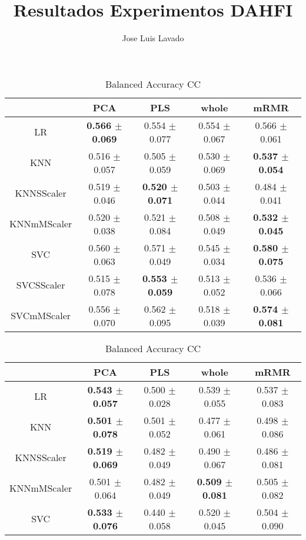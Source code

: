 \documentclass[]{report}
\title{Resultados Experimentos DAHFI}
\author{Jose Luis Lavado}
\begin{document}
\maketitle

	\begin{table}
		\centering
		\setlength{\aboverulesep}{0pt}
		\setlength{\belowrulesep}{0pt}
		\begin{tabular}{c|cccc}
			\hline
			             & PCA             & PLS             & whole           & mRMR            \\
			\hline
			 LR          & \textbf{0.566 $\pm$ 0.069} & 0.554 $\pm$ 0.077 & 0.554 $\pm$ 0.067 & 0.566 $\pm$ 0.061 \\
			 KNN         & 0.516 $\pm$ 0.057 & 0.505 $\pm$ 0.059 & 0.530 $\pm$ 0.069 & \textbf{0.537 $\pm$ 0.054} \\
			 KNNSScaler  & 0.519 $\pm$ 0.046 & \textbf{0.520 $\pm$ 0.071} & 0.503 $\pm$ 0.044 & 0.484 $\pm$ 0.041 \\
			 KNNmMScaler & 0.520 $\pm$ 0.038 & 0.521 $\pm$ 0.084 & 0.508 $\pm$ 0.049 & \textbf{0.532 $\pm$ 0.045} \\
			 SVC         & 0.560 $\pm$ 0.063 & 0.571 $\pm$ 0.049 & 0.545 $\pm$ 0.034 & \textbf{0.580 $\pm$ 0.075} \\
			 SVCSScaler  & 0.515 $\pm$ 0.078 & \textbf{0.553 $\pm$ 0.059} & 0.513 $\pm$ 0.052 & 0.536 $\pm$ 0.066 \\
			 SVCmMScaler & 0.556 $\pm$ 0.070 & 0.562 $\pm$ 0.095 & 0.518 $\pm$ 0.039 & \textbf{0.574 $\pm$ 0.081} \\
			\hline
		\end{tabular}
		\caption{\label{tab:bal_acc_CC} Balanced Accuracy CC}
		\vspace*{2cm}
		\begin{tabular}{c|cccc}
			\hline
			             & PCA             & PLS             & whole           & mRMR            \\
			\hline
			 LR          & \textbf{0.543 $\pm$ 0.057} & 0.500 $\pm$ 0.028 & 0.539 $\pm$ 0.055 & 0.537 $\pm$ 0.083 \\
			 KNN         & \textbf{0.501 $\pm$ 0.078} & 0.501 $\pm$ 0.052 & 0.477 $\pm$ 0.061 & 0.498 $\pm$ 0.086 \\
			 KNNSScaler  & \textbf{0.519 $\pm$ 0.069} & 0.482 $\pm$ 0.049 & 0.490 $\pm$ 0.067 & 0.486 $\pm$ 0.081 \\
			 KNNmMScaler & 0.501 $\pm$ 0.064 & 0.482 $\pm$ 0.049 & \textbf{0.509 $\pm$ 0.081} & 0.505 $\pm$ 0.082 \\
			 SVC         & \textbf{0.533 $\pm$ 0.076} & 0.440 $\pm$ 0.058 & 0.520 $\pm$ 0.045 & 0.504 $\pm$ 0.090 \\

\end{tabular}
\end{table}
\end{document}
